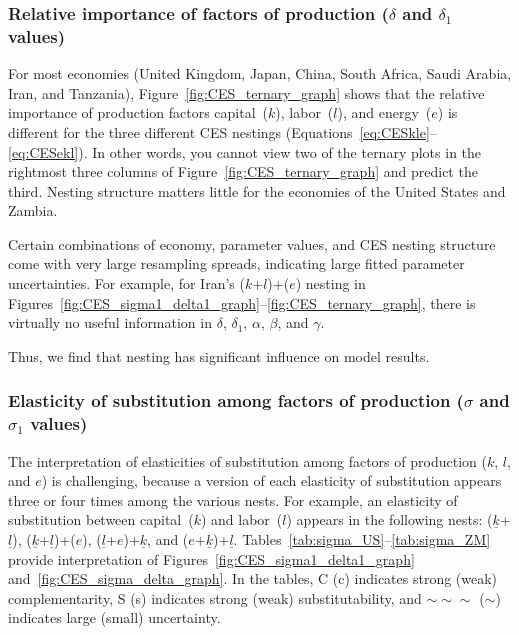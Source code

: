 \documentclass[preprint,authoryear,12pt]{elsarticle}\usepackage[]{graphicx}\usepackage[]{color}
\begin{document}
\subsubsection{Relative importance of factors of production ($\delta$ and $\delta_1$ values)} 
\label{sec:importance_of_factors}

For most economies (United Kingdom, Japan, China, South Africa, Saudi Arabia, Iran, and Tanzania), 
Figure~\ref{fig:CES_ternary_graph} shows that the relative importance of 
production factors capital~($k$), labor~($l$), and energy~($e$) 
is different for the three different CES nestings (Equations~\ref{eq:CESkle}--\ref{eq:CESekl}). 
In other words, you cannot view two of the ternary plots 
in the rightmost three columns of Figure~\ref{fig:CES_ternary_graph} and predict the third. 
Nesting structure matters little for the economies of the United States and Zambia.

Certain combinations of economy, parameter values, and CES nesting structure 
come with very large resampling spreads, 
indicating large fitted parameter uncertainties. 
For example, 
for Iran's ($k$+$l$)+($e$) nesting in Figures~\ref{fig:CES_sigma1_delta1_graph}--\ref{fig:CES_ternary_graph}, 
there is virtually no useful information 
in $\delta$, $\delta_1$, $\alpha$, $\beta$, and $\gamma$. 

Thus, we find that nesting has significant influence on model results.


\subsubsection{Elasticity of substitution among factors of production ($\sigma$ and $\sigma_1$ values)} 
\label{sec:elasticity_of_substitution}

The interpretation of elasticities of substitution 
among factors of production ($k$, $l$, and $e$) is challenging,
because a version of each elasticity of substitution appears three or four times 
among the various nests. 
For example, an elasticity of substitution between capital~($k$) and labor~($l$) 
appears in the following nests: 
($\underline{k}$+$\underline{l}$), 
($\underline{k}$+$\underline{l}$)+($e$), 
($\underline{l}$+$e$)+$\underline{k}$, and 
($e$+$\underline{k}$)+$\underline{l}$. 
Tables~\ref{tab:sigma_US}--\ref{tab:sigma_ZM} 
provide interpretation of Figures~\ref{fig:CES_sigma1_delta1_graph}
and~\ref{fig:CES_sigma_delta_graph}. 
In the tables,
C (c) indicates strong (weak) complementarity, 
S (s) indicates strong (weak) substitutability, and
$\sim\sim\sim$ ($\sim$) indicates large (small) uncertainty. 
\end{document}
